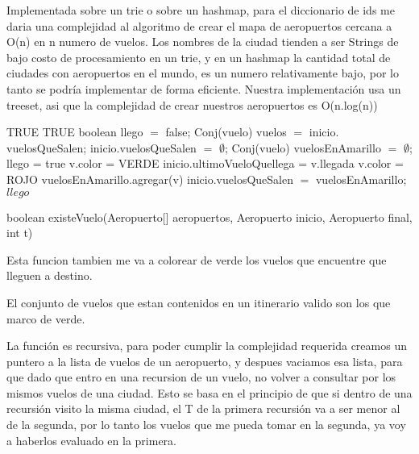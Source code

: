 Implementada sobre un trie o sobre un hashmap, para el diccionario de ids me daria una complejidad al algoritmo de crear el mapa de aeropuertos cercana a O(n) en n numero de vuelos. Los nombres de la ciudad tienden a ser Strings de bajo costo de procesamiento en un trie, y en un hashmap la cantidad total de ciudades con aeropuertos en el mundo, es un numero relativamente bajo, por lo tanto se podr\'ia implementar de forma eficiente.
Nuestra implementaci\'on usa un treeset, asi que la complejidad de crear nuestros aeropuertos es O(n.log(n))

\begin{algorithm}[H]
\begin{algorithmic}[1]
		\RETURN TRUE
\ENDIF
{}	
		\RETURN TRUE
\ENDIF
\STATE boolean llego $=$ false;
\STATE Conj(vuelo) vuelos $=$ inicio$.$vuelosQueSalen;
\STATE inicio$.$vuelosQueSalen $=$ $\emptyset$;
\STATE Conj(vuelo) vuelosEnAmarillo $=$ $\emptyset$;
				\STATE llego = true
				\STATE v.color = VERDE
					\STATE inicio.ultimoVueloQuellega = v.llegada
				\ENDIF
			\ELSE
				\STATE v.color = ROJO								
	    		\ENDIF    			
		\ENDIF
	\ELSE
		\STATE vuelosEnAmarillo.agregar(v)										    
    \ENDIF
\ENDFOR
\STATE inicio$.$vuelosQueSalen $=$ vuelosEnAmarillo;
\RETURN $llego$
\caption{boolean existeVuelo(Aeropuerto[] aeropuertos, Aeropuerto inicio, Aeropuerto final, int t)}%
\end{algorithmic}
\end{algorithm}

Esta funcion tambien me va a colorear de verde los vuelos que encuentre que lleguen a destino.

El conjunto de vuelos que estan contenidos en un itinerario valido son los que marco de verde.

La funci\'on es recursiva, para poder cumplir la complejidad requerida creamos un puntero a la lista de vuelos de un aeropuerto, y despues vaciamos esa lista, para que dado que entro en una recursion de un vuelo, no volver a consultar por los mismos vuelos de una ciudad. Esto se basa en el principio de que si dentro de una recursi\'on visito la misma ciudad, el T de la primera recursi\'on va a ser menor al de la segunda, por lo tanto los vuelos que me pueda tomar en la segunda, ya voy a haberlos evaluado en la primera.

